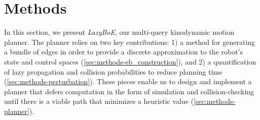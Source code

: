 

\section{Methods}\label{sec:methods}

In this section, we present \textsl{LazyBoE}, our multi-query kinodynamic motion planner. The planner relies on two key contributions: 1) a method for generating a bundle of edges in order to provide a discrete approximation to the robot's state and control spaces (\cref{sec:methods-eb_construction}), and 2) a quantification of lazy propagation and collision probabilities to reduce planning time (\cref{sec:methods-perturbation}). These pieces enable us to design and implement a planner that defers computation in the form of simulation and collision-checking until there is a viable path that minimizes a heuristic value (\cref{sec:methods-planner}).





